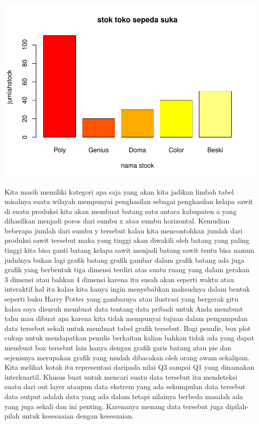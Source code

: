 \documentclass[
]{book}
\theoremstyle{definition}
\theoremstyle{definition}
\theoremstyle{definition}
\theoremstyle{definition}
\theoremstyle{remark}
\begin{document}
\includegraphics{_main_files/figure-latex/unnamed-chunk-12-2.pdf}

Kita masih memiliki kategori apa saja yang akan kita jadikan limbah tabel misalnya suatu wilayah mempunyai penghasilan sebagai penghasilan kelapa sawit di suatu produksi kita akan membuat batang satu antara kabupaten a yang dihasilkan menjadi poros dari sumbu x atau sumbu horizontal. Kemudian beberapa jumlah dari sumbu y tersebut kalau kita mencontohkan jumlah dari produksi sawit tersebut maka yang tinggi akan diwakili oleh batang yang paling tinggi kita bisa ganti batang kelapa sawit menjadi batang sawit tentu bisa namun judulnya bukan lagi grafik batang grafik gambar dalam grafik batang ada juga grafik yang berbentuk tiga dimensi terdiri atas suatu ruang yang dalam gerakan 3 dimensi atau bahkan 4 dimensi karena itu susah akan seperti waktu atau interaktif hal itu kalau kita hanya ingin menyebabkan maksudnya dalam bentuk seperti buku Harry Potter yang gambarnya atau ilustrasi yang bergerak gitu kalau saya disuruh membuat data tentang data pribadi untuk Anda membuat tahu mau dibuat apa karena kita tidak mempunyai tujuan dalam pengumpulan data tersebut sekali untuk membuat tabel grafik tersebut.
Bagi penulis, box plot cukup untuk mendapatkan penulis berkaitan kalian bahkan tidak ada yang dapat membuat box tersebut lain hanya dengan grafik garis batang atau pie dan sejenisnya merupakan grafik yang mudah dibacakan oleh orang awam sekalipun. Kita melihat kotak itu representasi daripada nilai Q3 sampai Q1 yang dinamakan interkuartil. Khusus buat untuk mencari suatu data tersebut itu mendeteksi suatu dari out layer ataupun data ekstrem yang ada sekumpulan data tersebut data output adalah data yang ada dalam tetapi nilainya berbeda masalah ada yang juga sekali dan ini penting. Karenanya menang data tersebut juga dipilah-pilah untuk kesesuaian dengan kesesuaian.
\end{document}
